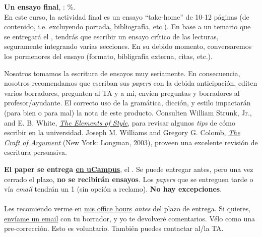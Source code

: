 \documentclass[letterpaper]{article}
\renewenvironment{itemize}{
  \begin{list}{}{
    \setlength{\leftmargin}{1.5em}
  }
}{
  \end{list}
}
\begin{document}
\begin{enumerate}
%

	\item {\bf Un ensayo final}, {\unskip}: {\unskip}\%.\\


En este curso, la actividad final es un ensayo ``take-home'' de 10-12 p\'aginas (de contenido, i.e. excluyendo portada, bibliograf\'ia, etc.). En base a un temario que se entregar\'a el {\unskip}, tendr\'as que escribir un ensayo cr\'itico de las lecturas, seguramente integrando varias secciones. {\color{red}En su debido momento, conversaremos los pormenores del ensayo (formato, bibligraf\'ia externa, citas, etc.)}. 



	\begin{itemize}
		\item[\Pointinghand] Nosotros tomamos la escritura de ensayos muy seriamente. En consecuencia, nosotros recomendamos que escriban sus \emph{papers} con la debida anticipaci\'on, editen varios borradores, pregunten al TA y a mi, env\'ien preguntas y borradores al profesor/ayudante. El correcto uso de la gram\'atica, dicci\'on, y estilo impactar\'an (para bien o para mal) la nota de este producto. Consulten William Strunk, Jr., and E. B. White, \href{http://www.jlakes.org/ch/web/The-elements-of-style.pdf}{\emph{The Elements of Style}}, para revisar algunos \emph{tips} de c\'omo escribir en la universidad. Joseph M. Williams and Gregory G. Colomb, \href{http://sir.spbu.ru/en/programs/master/master_program_in_international_relations/digital_library/Book%20Research%20seminar%20by%20Booth.pdf}{\emph{The Craft of Argument}} (New York: Longman, 2003), proveen una excelente revisi\'on de escritura persuasiva.
	\end{itemize}


	{\bf El paper se entrega \underline{en uCampus}}, el {\bf {\unskip}}. Se puede entregar antes, pero una vez cerrado el plazo, {\bf no se recibir\'an ensayos}. Los \emph{papers} que se entreguen tarde o v\'ia \emph{email} tendr\'an un 1 (sin opci\'on a reclamo). {\bf No hay excepciones}. 
	\\
	\\
	Les recomiendo verme en \href{https://calendly.com/bahamonde/officehours}{mis office hours} \emph{antes} del plazo de entrega. Si quieres, \href{mailto:\filetext}{env\'iame un email} con tu borrador, y yo te devolver\'e comentarios. V\'elo como una pre-correcci\'on. Esto es voluntario. Tambi\'en puedes contactar al/la TA. 


\end{enumerate}
\end{document}
